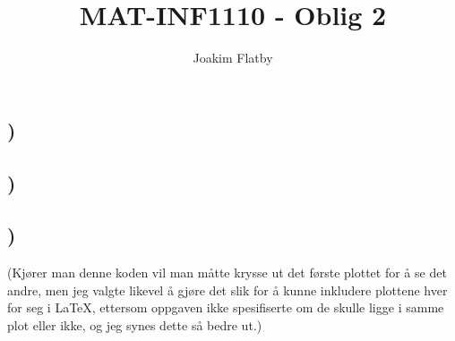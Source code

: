 \documentclass[a4paper,10pt,norsk]{article}
\title{MAT-INF1110 - Oblig 2}
\author{Joakim Flatby}
\begin{document}
\maketitle

\section{}

\subsection{)}


\subsection{)}


\subsection{)}

(Kjører man denne koden vil man måtte krysse ut det første plottet for å se det andre, men jeg valgte likevel å gjøre det slik for å kunne inkludere plottene hver for seg i LaTeX, ettersom oppgaven ikke spesifiserte om de skulle ligge i samme plot eller ikke, og jeg synes dette så bedre ut.)


\end{document}
